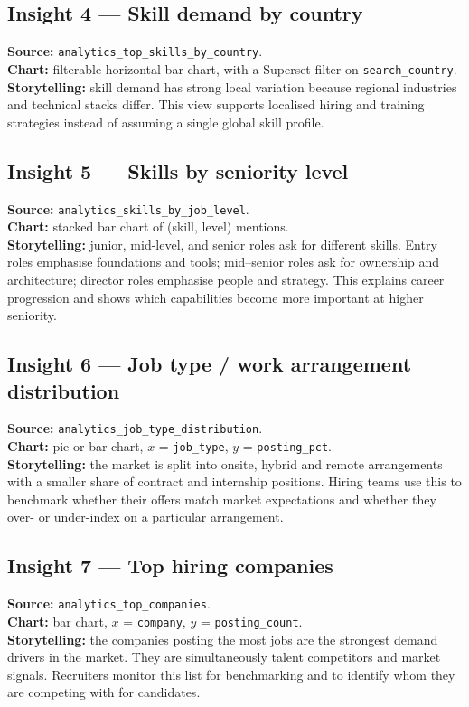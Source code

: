 \documentclass[11pt,a4paper]{article}
\begin{document}
\subsection{Insight 4 --- Skill demand by country}
\textbf{Source:} \texttt{analytics\_top\_skills\_by\_country}.\\
\textbf{Chart:} filterable horizontal bar chart, with a Superset
filter on \texttt{search\_country}.\\
\textbf{Storytelling:} skill demand has strong local variation
because regional industries and technical stacks differ.  This view
supports localised hiring and training strategies instead of assuming
a single global skill profile.

\subsection{Insight 5 --- Skills by seniority level}
\textbf{Source:} \texttt{analytics\_skills\_by\_job\_level}.\\
\textbf{Chart:} stacked bar chart of (skill, level) mentions.\\
\textbf{Storytelling:} junior, mid-level, and senior roles ask for
different skills.  Entry roles emphasise foundations and tools;
mid--senior roles ask for ownership and architecture; director roles
emphasise people and strategy.  This explains career progression and
shows which capabilities become more important at higher seniority.

\subsection{Insight 6 --- Job type / work arrangement distribution}
\textbf{Source:} \texttt{analytics\_job\_type\_distribution}.\\
\textbf{Chart:} pie or bar chart, $x$ = \texttt{job\_type},
$y$ = \texttt{posting\_pct}.\\
\textbf{Storytelling:} the market is split into onsite, hybrid and
remote arrangements with a smaller share of contract and internship
positions.  Hiring teams use this to benchmark whether their offers
match market expectations and whether they over- or under-index on a
particular arrangement.

\subsection{Insight 7 --- Top hiring companies}
\textbf{Source:} \texttt{analytics\_top\_companies}.\\
\textbf{Chart:} bar chart, $x$ = \texttt{company},
$y$ = \texttt{posting\_count}.\\
\textbf{Storytelling:} the companies posting the most jobs are the
strongest demand drivers in the market.  They are simultaneously
talent competitors and market signals.  Recruiters monitor this list
for benchmarking and to identify whom they are competing with for
candidates.
\end{document}
